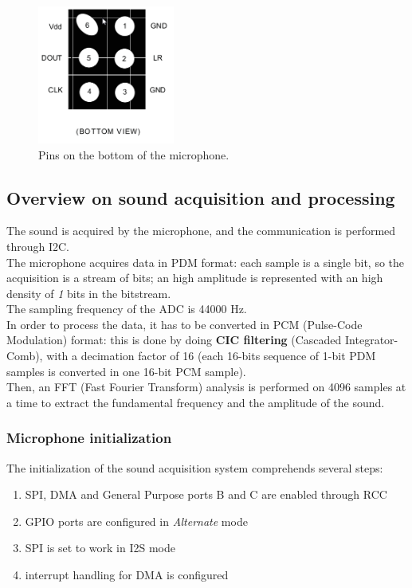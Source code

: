 \begin{figure}[H]
	\hspace*{0.3 \textwidth}\includegraphics[width= 0.4\textwidth]
	{files/images/mic_bottom_pins}
	\caption{Pins on the bottom of the microphone.}
\end{figure}

\subsection{Overview on sound acquisition and processing}
The sound is acquired by the microphone, and the communication is performed through I2C.\\
The microphone acquires data in PDM format: each sample is a single bit, so the acquisition is a stream of bits; an high amplitude is represented with an high density of \textit{1} bits in the bitstream. \\
The sampling frequency of the ADC is 44000 Hz. \\
In order to process the data, it has to be converted in PCM (Pulse-Code Modulation) format: this is done by doing \textbf{CIC filtering} (Cascaded Integrator-Comb), with a decimation factor of 16 (each 16-bits sequence of 1-bit PDM samples is converted in one 16-bit PCM sample).\\
Then, an FFT (Fast Fourier Transform) analysis is performed on 4096 samples at a time to extract the fundamental frequency and the amplitude of the sound.

\subsubsection{Microphone initialization}
The initialization of the sound acquisition system comprehends several steps:
\begin{enumerate}
	\item SPI, DMA and General Purpose ports B and C are enabled through RCC
	\item GPIO ports are configured in \textit{Alternate} mode
	\item SPI is set to work in I2S mode
	\item interrupt handling for DMA is configured
	
\end{enumerate}

